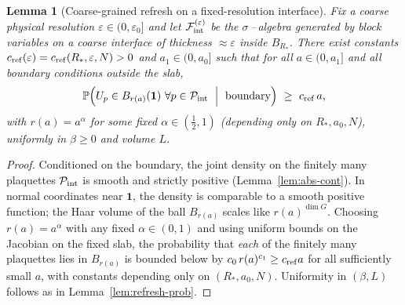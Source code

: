 \documentclass[11pt]{amsart}
\theoremstyle{plain}
\newtheorem{lemma}[theorem]{Lemma}
\theoremstyle{definition}
\theoremstyle{remark}
\begin{document}
\begin{lemma}[Coarse-grained refresh on a fixed-resolution interface]\label{lem:refresh-prob-linear}
Fix a coarse physical resolution $\varepsilon\in(0,\varepsilon_0]$ and let $\mathcal F_{\rm int}^{(\varepsilon)}$ be the $\sigma$\,–\,algebra generated by block variables on a coarse interface of thickness $\approx \varepsilon$ inside $B_{R_*}$. There exist constants $c_{\rm ref}(\varepsilon)=c_{\rm ref}(R_*,\varepsilon,N)>0$ and $a_1\in(0,a_0]$ such that for all $a\in(0,a_1]$ and all boundary conditions outside the slab,
\[
  \mathbb P\Big( U_p\in B_{r(a)}(\mathbf 1)\ \forall p\in\mathcal P_{\rm int}\ \Bigm|\ \text{boundary}\Big)\ \ge\ c_{\rm ref}\,a,
\]
with $r(a)=a^{\alpha}$ for some fixed $\alpha\in(\tfrac12,1)$ (depending only on $R_*,a_0,N$), uniformly in $\beta\ge 0$ and volume $L$.
\end{lemma}
\begin{proof}
Conditioned on the boundary, the joint density on the finitely many plaquettes $\mathcal P_{\rm int}$ is smooth and strictly positive (Lemma~\ref{lem:abs-cont}). In normal coordinates near $\mathbf 1$, the density is comparable to a smooth positive function; the Haar volume of the ball $B_{r(a)}$ scales like $r(a)^{\dim G}$. Choosing $r(a)=a^{\alpha}$ with any fixed $\alpha\in(0,1)$ and using uniform bounds on the Jacobian on the fixed slab, the probability that \emph{each} of the finitely many plaquettes lies in $B_{r(a)}$ is bounded below by $c_0\,r(a)^{c_1}\ge c_{\rm ref} a$ for all sufficiently small $a$, with constants depending only on $(R_*,a_0,N)$. Uniformity in $(\beta,L)$ follows as in Lemma~\ref{lem:refresh-prob}.
\end{proof}
\end{document}
